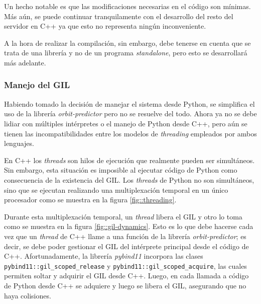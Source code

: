 \documentclass[../../main.tex]{subfiles}
\begin{document}
Un hecho notable es que las modificaciones necesarias en el código son mínimas. Más aún, se puede continuar tranquilamente con el desarrollo del resto del servidor en C++ ya que esto no representa ningún inconveniente. 

A la hora de realizar la compilación, sin embargo, debe tenerse en cuenta que se trata de una librería y no de un programa \textit{standalone}, pero esto se desarrollará más adelante.

\subsubsection{Manejo del GIL}
Habiendo tomado la decisión de manejar el sistema desde Python, se simplifica el uso de la librería \textit{orbit-predictor} pero no se resuelve del todo. Ahora ya no se debe lidiar con múltiples intérpretes o el manejo de Python desde C++, pero aún se tienen las incompatibilidades entre los modelos de \textit{threading} empleados por ambos lenguajes.

En C++ los \textit{threads} son hilos de ejecución que realmente pueden ser simultáneos. Sin embargo, esta situación es imposible al ejecutar código de Python como consecuencia de la existencia del GIL. Los \textit{threads} de Python no son simultáneos, sino que se ejecutan realizando una multiplexación temporal en un único procesador como se muestra en la figura \ref{fig::threading}.

Durante esta multiplexación temporal, un \textit{thread} libera el GIL y otro lo toma como se muestra en la figura \ref{fig::gil-dynamics}. Esto es lo que debe hacerse cada vez que un \textit{thread} de C++ llame a una función de la librería \textit{orbit-predictor}; es decir, se debe poder gestionar el GIL del intérprete principal desde el código de C++. 
Afortunadamente, la librería \textit{pybind11} incorpora las clases \texttt{pybind11::gil\_scoped\_release} y \texttt{pybind11::gil\_scoped\_acquire}, las cuales permiten soltar y adquirir el GIL desde C++. Luego, en cada llamada a código de Python desde C++ se adquiere y luego se libera el GIL, asegurando que no haya colisiones.



\end{document}
